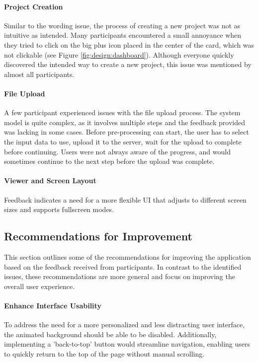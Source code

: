 \paragraph{Project Creation}
Similar to the wording issue, the process of creating a new project was not as intuitive as intended.
Many participants encountered a small annoyance when they tried to click on the big plus icon placed in the center of the card, which was not clickable (see Figure \ref{fig:design:dashboard}).
Although everyone quickly discovered the intended way to create a new project, this issue was mentioned by almost all participants.

\paragraph{File Upload}
\label{sec:results:issues:file_upload}
A few participant experienced issues with the file upload process.
The system model is quite complex, as it involves multiple steps and the feedback provided was lacking in some cases.
Before pre-processing can start, the user has to select the input data to use, upload it to the server, wait for the upload to complete before continuing.
Users were not always aware of the progress, and would sometimes continue to the next step before the upload was complete. 

\paragraph{Viewer and Screen Layout}
Feedback indicates a need for a more flexible UI that adjusts to different screen sizes and supports fullscreen modes.

\subsection*{Recommendations for Improvement}
\label{sec:results:recommendations}

This section outlines some of the recommendations for improving the application based on the feedback received from participants. 
In contrast to the identified issues, these recommendations are more general and focus on improving the overall user experience.

\paragraph{Enhance Interface Usability}
To address the need for a more personalized and less distracting user interface, the animated background should be able to be disabled.
Additionally, implementing a 'back-to-top' button would streamline navigation, enabling users to quickly return to the top of the page without manual scrolling.


